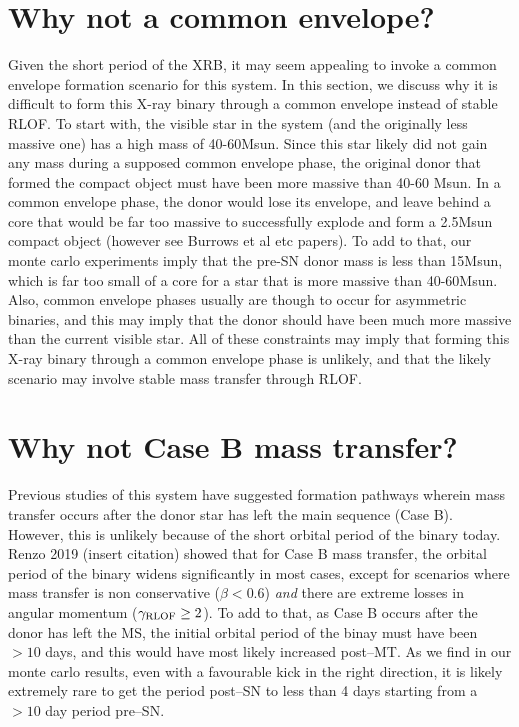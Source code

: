 \documentclass[linenumbers,trackchanges,twocolumn]{aastex701}
\begin{document}
\section{Why not a common envelope?}

Given the short period of the XRB, it may seem appealing to invoke a common envelope formation scenario for this system. In this section, we discuss why it is difficult to form this X-ray binary through a common envelope instead of stable RLOF. To start with, the visible star in the system (and the originally less massive one) has a high mass of 40-60Msun. Since this star likely did not gain any mass during a supposed common envelope phase, the original donor that formed the compact object must have been more massive than 40-60 Msun. In a common envelope phase, the donor would lose its envelope, and leave behind a core that would be far too massive to successfully explode and form a 2.5Msun compact object (however see Burrows et al etc papers). To add to that, our monte carlo experiments imply that the pre-SN donor mass is less than 15Msun, which is far too small of a core for a star that is more massive than 40-60Msun. Also, common envelope phases usually are though to occur for asymmetric binaries, and this may imply that the donor should have been much more massive than the current visible star. All of these constraints may imply that forming this X-ray binary through a common envelope phase is unlikely, and that the likely scenario may involve stable mass transfer through RLOF.

\section{Why not Case B mass transfer?}

Previous studies of this system have suggested formation pathways wherein mass transfer occurs after the donor star has left the main sequence (Case B). However, this is unlikely because of the short orbital period of the binary today. Renzo 2019 (insert citation) showed that for Case B mass transfer, the orbital period of the binary widens significantly in most cases, except for scenarios where mass transfer is non conservative ($\beta < 0.6$) \textit{and} there are extreme losses in angular momentum ($\gamma_{\rm RLOF} \geq 2$). To add to that, as Case B occurs after the donor has left the MS, the initial orbital period of the binay must have been $>10$ days, and this would have most likely increased post--MT. As we find in our monte carlo results, even with a favourable kick in the right direction, it is likely extremely rare to get the period post--SN to less than 4 days starting from a $>10$ day period pre--SN.
\end{document}
